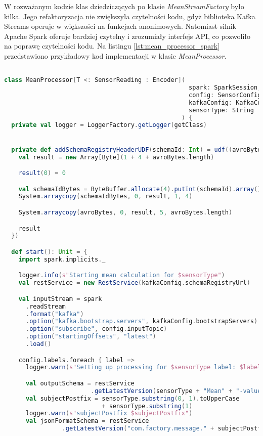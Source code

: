 \newpage

W rozważanym kodzie klas dziedziczących po klasie \textit{MeanStreamFactory} było kilka. Jego refaktoryzacja nie zwiększyła czytelności kodu, gdyż biblioteka Kafka Streams \cite{kafka_streams} operuje w większości na funkcjach anonimowych. Natomiast silnik Apache Spark oferuje bardziej czytelny i zrozumiały interfejs API, co pozwoliło na poprawę czytelności kodu. Na listingu \ref{lst:mean_processor_spark} przedstawiono przykładowy kod implementacji w klasie \textit{MeanProcessor}.

\begin{lstlisting}[caption=Nowa implementacja przetwarzająca strumienie danych, label={lst:mean_processor_spark},language=Scala]

class MeanProcessor[T <: SensorReading : Encoder](
                                                   spark: SparkSession,
                                                   config: SensorConfig,
                                                   kafkaConfig: KafkaConfig,
                                                   sensorType: String
                                                 ) {
  private val logger = LoggerFactory.getLogger(getClass)


  private def addSchemaRegistryHeaderUDF(schemaId: Int) = udf((avroBytes: Array[Byte]) => {
    val result = new Array[Byte](1 + 4 + avroBytes.length)

    result(0) = 0

    val schemaIdBytes = ByteBuffer.allocate(4).putInt(schemaId).array()
    System.arraycopy(schemaIdBytes, 0, result, 1, 4)

    System.arraycopy(avroBytes, 0, result, 5, avroBytes.length)

    result
  })

  def start(): Unit = {
    import spark.implicits._

    logger.info(s"Starting mean calculation for $sensorType")
    val restService = new RestService(kafkaConfig.schemaRegistryUrl)

    val inputStream = spark
      .readStream
      .format("kafka")
      .option("kafka.bootstrap.servers", kafkaConfig.bootstrapServers)
      .option("subscribe", config.inputTopic)
      .option("startingOffsets", "latest")
      .load()

    config.labels.foreach { label =>
      logger.warn(s"Setting up processing for $sensorType label: $label")

      val outputSchema = restService
                        .getLatestVersion(sensorType + "Mean" + "-value")
      val subjectPostfix = sensorType.substring(0, 1).toUpperCase 
                           + sensorType.substring(1)
      logger.warn(s"subjectPostfix $subjectPostfix")
      val jsonFormatSchema = restService
                .getLatestVersion("com.factory.message." + subjectPostfix)


\end{lstlisting}
